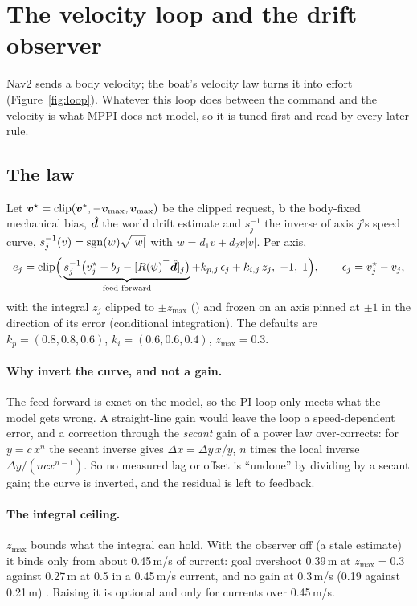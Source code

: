 \section{The velocity loop and the drift observer}
\label{sec:vlaw}

Nav2 sends a body velocity; the boat's velocity law turns it into effort
(Figure~\ref{fig:loop}). Whatever this loop does between the command and the velocity is what
MPPI does not model, so it is tuned first and read by every later rule.



\subsection{The law}
Let $\bm v^\star = \operatorname{clip}(\bm v^*, -\bm v_\text{max}, \bm v_\text{max})$ be the clipped request,
$\bm b$ the body-fixed mechanical bias, $\hat{\bm d}$ the world drift estimate and $s_j^{-1}$ the
inverse of axis $j$'s speed curve, $s_j^{-1}(v) = \operatorname{sgn}(w)\sqrt{|w|}$ with $w = d_1 v + d_2 v|v|$.
Per axis,
\[
  e_j = \operatorname{clip}\!\Big(\underbrace{s_j^{-1}\big(v^\star_j - b_j - [R(\psi)^\top\hat{\bm d}]_j\big)}_{\text{feed-forward}}
        + k_{p,j}\,\epsilon_j + k_{i,j}\,z_j,\; -1,\; 1\Big),
  \qquad \epsilon_j = v^\star_j - v_j ,
\]
with the integral $z_j$ clipped to $\pm z_\text{max}$ () and frozen on an
axis pinned at $\pm1$ in the direction of its error (conditional integration). The
defaults are $k_p = (0.8, 0.8, 0.6)$, $k_i = (0.6, 0.6, 0.4)$, $z_\text{max} = 0.3$.

\paragraph{Why invert the curve, and not a gain.} The feed-forward is exact on the model, so
the PI loop only meets what the model gets wrong. A straight-line gain would leave the loop a
speed-dependent error, and a correction through the \emph{secant} gain of a power law
over-corrects: for $y = c\,x^n$ the secant inverse gives $\Delta x = \Delta y\,x/y$, $n$ times
the local inverse $\Delta y/(n c x^{n-1})$. So no measured lag or offset is ``undone'' by
dividing by a secant gain; the curve is inverted, and the residual is left to feedback.

\paragraph{The integral ceiling.} $z_\text{max}$ bounds what the integral can hold. With the
observer off (a stale estimate) it binds only from about 0.45\,m/s of current: goal overshoot
0.39\,m at $z_\text{max} = 0.3$ against 0.27\,m at 0.5 in a 0.45\,m/s current, and no gain at
0.3\,m/s (0.19 against 0.21\,m) .
Raising it is optional and only for currents over 0.45\,m/s.

